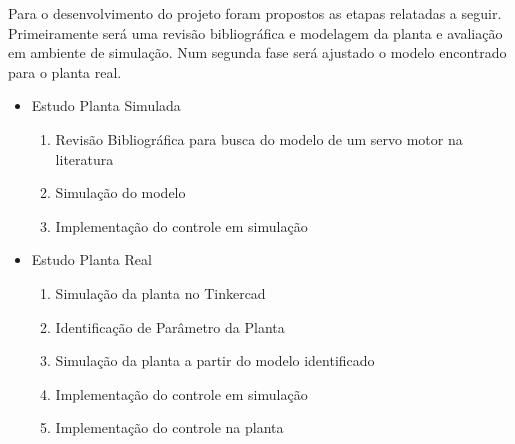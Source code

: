 \documentclass[a4paper,11pt]{article}
\begin{document}
Para o desenvolvimento do projeto foram propostos as etapas relatadas a seguir. Primeiramente será uma revisão bibliográfica e modelagem da planta e avaliação em ambiente de simulação. Num segunda fase será ajustado o modelo encontrado para o planta real.

\begin{itemize}
    \item Estudo Planta Simulada
    \begin{enumerate}
        \item Revisão Bibliográfica para busca do modelo de um servo motor na literatura
        \item Simulação do modelo
        \item Implementação do controle em simulação
    \end{enumerate}
    \item Estudo Planta Real
    \begin{enumerate}
        \item Simulação da planta no Tinkercad
        \item Identificação de Parâmetro da Planta
        \item Simulação da planta a partir do modelo identificado
        \item Implementação do controle em simulação
        \item Implementação do controle na planta
    \end{enumerate}
\end{itemize}

\newpage

\nocite{ogata2010modern}

\end{document}
